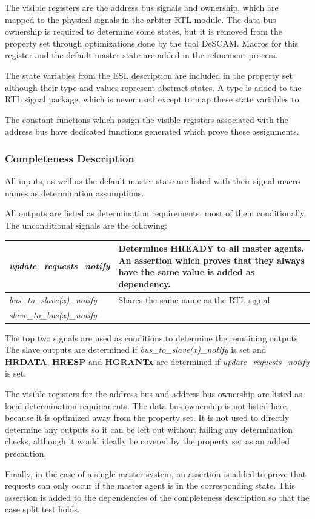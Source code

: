 The visible registers are the address bus signals and ownership, which are mapped to the physical signals in the arbiter RTL module. The data bus ownership is required to determine some states, but it is removed from the property set through optimizations done by the tool DeSCAM. Macros for this register and the default master state are added in the refinement process. \par
The state variables from the ESL description are included in the property set although their type and values represent abstract states. A type is added to the RTL signal package, which is never used except to map these state variables to. \par
The constant functions which assign the visible registers associated with the address bus have dedicated functions generated which prove these assignments. 


\subsubsection{Completeness Description}
All inputs, as well as the default master state are listed with their signal macro names as determination assumptions. \par
All outputs are listed as determination requirements, most of them conditionally. The unconditional signals are the following: \\

\begin{tabular}{p{4.3cm} | p{10cm}}
\textit{update\_requests\_notify} & Determines \textbf{HREADY} to all master agents. An assertion which proves that they always have the same value is added as dependency. \\
\hline
\textit{bus\_to\_slave(x)\_notify} & Shares the same name as the RTL signal \\
\textit{slave\_to\_bus(x)\_notify} &  \\
\end{tabular}

The top two signals are used as conditions to determine the remaining outputs. The slave outputs are determined if \textit{bus\_to\_slave(x)\_notify} is set and \textbf{HRDATA}, \textbf{HRESP} and \textbf{HGRANTx} are determined if \textit{update\_requests\_notify} is set. \par

The visible registers for the address bus and address bus ownership are listed as local determination requirements. The data bus ownership is not listed here, because it is optimized away from the property set. It is not used to directly determine any outputs so it can be left out without failing any determination checks, although it would ideally be covered by the property set as an added precaution. \par
Finally, in the case of a single master system, an assertion is added to prove that requests can only occur if the master agent is in the corresponding state. This assertion is added to the dependencies of the completeness description so that the case split test holds. 

